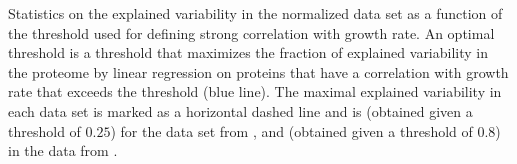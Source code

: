 \label{fig:threshold}
  Statistics on the explained variability in the normalized data set as a function of the threshold used for defining strong correlation with growth rate.
  An optimal threshold is a threshold that maximizes the fraction of explained variability in the proteome by linear regression on proteins that have a correlation with growth rate that exceeds the threshold (blue line).
  The maximal explained variability in each data set is marked as a horizontal dashed line and is \hMaxExpVar{} (obtained given a threshold of $0.25$) for the data set from \cite{Heinemann2015}, and \vMaxExpVar{} (obtained given a threshold of $0.8$) in the data from \cite{Valgepea2013}.

